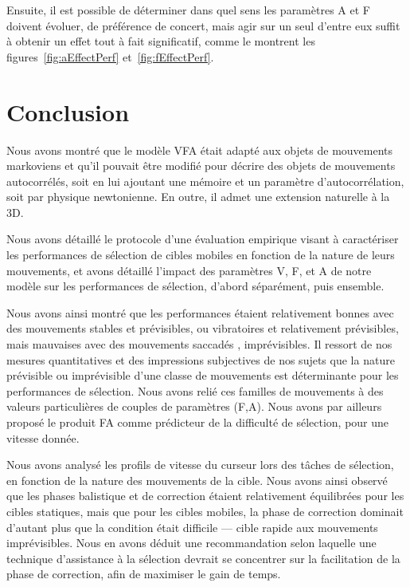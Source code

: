 	Ensuite, il est possible de déterminer dans quel sens les paramètres A et F doivent évoluer, de préférence de concert, mais agir sur un seul d'entre eux suffit à obtenir un effet tout à fait significatif, comme le montrent les figures~\ref{fig:aEffectPerf} et~\ref{fig:fEffectPerf}.

\section{Conclusion}
	Nous avons montré que le modèle VFA était adapté aux objets de mouvements markoviens et qu'il pouvait être modifié pour décrire des objets de mouvements autocorrélés, soit en lui ajoutant une mémoire et un paramètre d'autocorrélation, soit par physique newtonienne. En outre, il admet une extension naturelle à la 3D.
	
	Nous avons détaillé le protocole d'une évaluation empirique visant à caractériser les performances de sélection de cibles mobiles en fonction de la nature de leurs mouvements, et avons détaillé l'impact des paramètres V, F, et A de notre modèle sur les performances de sélection, d'abord séparément, puis ensemble.
	
	Nous avons ainsi montré que les performances étaient relativement bonnes avec des mouvements \og stables \fg{} et prévisibles, ou \og vibratoires \fg{} et relativement prévisibles, mais mauvaises avec des mouvements \og saccadés \fg{}, imprévisibles. Il ressort de nos mesures quantitatives et des impressions subjectives de nos sujets que la nature prévisible ou imprévisible d'une classe de mouvements est déterminante pour les performances de sélection. Nous avons relié ces familles de mouvements à des valeurs particulières de couples de paramètres (F,A). Nous avons par ailleurs proposé le produit FA comme prédicteur de la difficulté de sélection, pour une vitesse donnée.
	
	Nous avons analysé les profils de vitesse du curseur lors des tâches de sélection, en fonction de la nature des mouvements de la cible. Nous avons ainsi observé que les phases balistique et de correction étaient relativement équilibrées pour les cibles statiques, mais que pour les cibles mobiles, la phase de correction dominait d'autant plus que la condition était difficile --- cible rapide aux mouvements imprévisibles. Nous en avons déduit une recommandation selon laquelle une technique d'assistance à la sélection devrait se concentrer sur la facilitation de la phase de correction, afin de maximiser le gain de temps.
	
